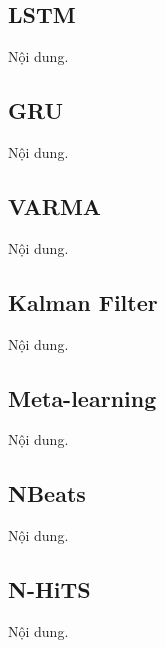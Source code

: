 \subsection{LSTM}
Nội dung.

\subsection{GRU}
Nội dung.

\subsection{VARMA}
Nội dung. 

\subsection{Kalman Filter}
Nội dung.

\subsection{Meta-learning}
Nội dung.


\subsection{NBeats}
Nội dung.

\subsection{N-HiTS}
Nội dung.

